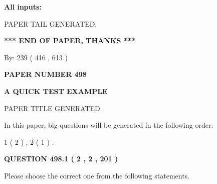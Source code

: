 \documentclass[12pt]{article}
\begin{document}
   
   
   
\noindent{}
   
   
   
   
\noindent\vspace{0.1in}\hspace{-0.08in} {\textbf{\Large{All inputs: }}}
   
   
   
   
   
   
 \vspace{0.2in}
 
   
   
\vspace{2.0in} PAPER TAIL GENERATED.
   
   
   
   
\vspace{1.0in} 
{\textbf{\large{ *** END OF PAPER, THANKS *** }}} 
   
   
\hspace{1.0in} By: 
 239 ( 416 ,  613 )
   
   
   
   
\newpage 
\setcounter{page}{ 
   498001 } 
   
   
   
   
 {\textbf{ \Large{ PAPER NUMBER  498  }}}
   
   
\vspace{0.2in}
   
   
   
   
   
   
   
   
 \vspace{0.2in}
{\LARGE {\textbf{ A QUICK TEST EXAMPLE}}}
   
   
 PAPER TITLE GENERATED.
   
   
   
\vspace{0.2in}
   
In this paper, big questions will be generated in the following order: 
   
   
   1 ( 2 )
 ,
   2 ( 1 )
 .
  
\vspace{0.2in}
  
{\textbf{\Large{QUESTION
498.1 
 ( 2 , 2 , 201 )
}}}
  
  
Please choose the correct one from the following statements.
 
\end{document}
